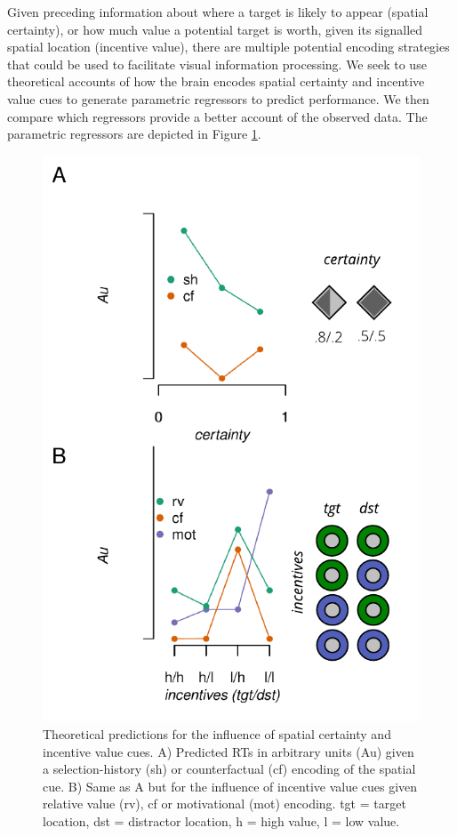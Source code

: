\documentclass[11pt,halfline,a4paper,]{ouparticle}
\begin{document}
\label{sec:Theory}

Given preceding information about where a target is likely to appear (spatial certainty), or how much value a potential target is worth, given its signalled spatial location (incentive value), there are multiple potential encoding strategies that could be used to facilitate visual information processing. We seek to use theoretical accounts of how the brain encodes spatial certainty and incentive value cues to generate parametric regressors to predict performance. We then compare which regressors provide a better account of the observed data. The parametric regressors are depicted in Figure \ref{fig:predres}.

\begin{figure}[p]

{\centering \includegraphics[width=1\linewidth]{../images/doc-theoret-pred} 

}

\caption{Theoretical predictions for the influence of spatial certainty and incentive value cues. A) Predicted RTs in arbitrary units (Au) given a selection-history (sh) or counterfactual (cf) encoding of the spatial cue. B) Same as A but for the influence of incentive value cues given relative value (rv), cf or motivational (mot) encoding. tgt = target location, dst = distractor location, h = high value, l = low value.}\label{fig:predres}
\end{figure}
\end{document}

